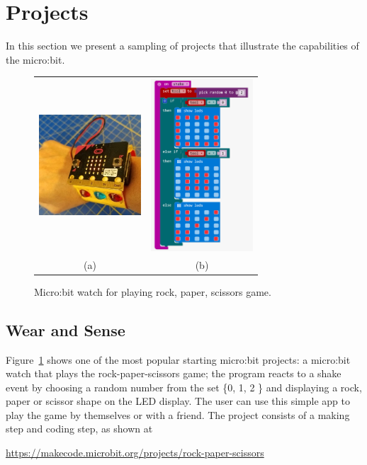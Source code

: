 \section{Projects}
\label{sec:}

In this section we present a sampling of projects that 
illustrate the capabilities of the micro:bit. 

\begin{figure} 
    \begin{tabular}{cc}
        \includegraphics[width=1.5in]{images/rock-paper-scissors.jpg}  &
        \includegraphics[width=1.5in]{images/rpsBlocks.png} \\
        (a) & (b) 
      \end{tabular}
    \caption{\label{fig:rps}Micro:bit watch for playing rock, paper, scissors game.}
\end{figure}

\subsection{Wear and Sense}

Figure~\ref{fig:rps} shows one of the most popular starting micro:bit projects:
a micro:bit watch that plays the rock-paper-scissors game; the program reacts
to a shake event by choosing a random number from the set \{0, 1, 2 \}
and displaying a rock, paper or scissor shape on the LED display. The
user can use this simple app to play the game by themselves or with
a friend. The project consists of a making step and coding step,
as shown at
\begin{center}
\url{https://makecode.microbit.org/projects/rock-paper-scissors}
\end{center}

